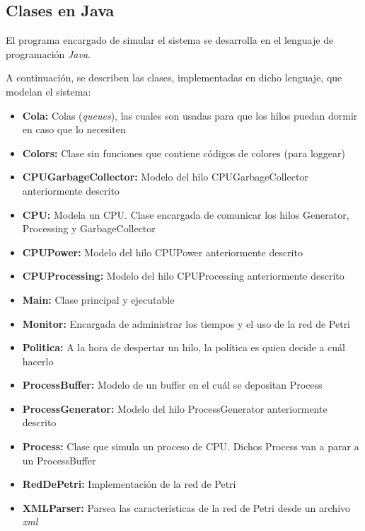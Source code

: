 \documentclass{article}
\begin{document}
    \subsection{Clases en Java}
    El programa encargado de simular el sistema se desarrolla en el lenguaje de programación
    \emph{Java}. \par
    A continuación, se describen las clases, implementadas en dicho lenguaje,
    que modelan el sistema:
    \begin{itemize}
        \item \textbf{Cola:} Colas (\emph{queues}), las cuales son usadas para que los
        hilos puedan dormir en caso que lo necesiten
        \item \textbf{Colors:} Clase sin funciones que contiene códigos de colores (para 
        loggear)
        \item \textbf{CPUGarbageCollector:} Modelo del hilo CPUGarbageCollector anteriormente
        descrito
        \item \textbf{CPU:} Modela un CPU. Clase encargada de comunicar los hilos Generator,
        Processing y GarbageCollector
        \item \textbf{CPUPower:} Modelo del hilo CPUPower anteriormente descrito
        \item \textbf{CPUProcessing:} Modelo del hilo CPUProcessing anteriormente descrito
        \item \textbf{Main:} Clase principal y ejecutable
        \item \textbf{Monitor:} Encargada de administrar los tiempos y el uso de la red de 
        Petri
        \item \textbf{Politica:} A la hora de despertar un hilo, la política es quien decide
        a cuál hacerlo
        \item \textbf{ProcessBuffer:} Modelo de un buffer en el cuál se depositan Process
        \item \textbf{ProcessGenerator:} Modelo del hilo ProcessGenerator anteriormente
        descrito
        \item \textbf{Process:} Clase que simula un proceso de CPU. Dichos Process van a
        parar a un ProcessBuffer
        \item \textbf{RedDePetri:} Implementación de la red de Petri
        \item \textbf{XMLParser:} Parsea las características de la red de Petri desde un
        archivo \emph{xml}
    \end{itemize} \par
\end{document}
